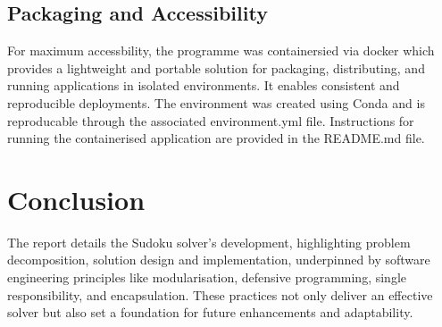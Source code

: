 \documentclass[11pt]{article}
\begin{document}
\subsection{Packaging and Accessibility}
For maximum accessbility, the programme was containersied via docker which provides a lightweight and portable solution for packaging, distributing, and running applications in isolated environments. It enables consistent and reproducible deployments. The environment was created using Conda and is reproducable through the associated environment.yml file. Instructions for running the containerised application are provided in the README.md file.

\section{Conclusion}
The report details the Sudoku solver's development, highlighting problem decomposition, solution design and implementation, underpinned by software engineering principles like modularisation, defensive programming, single responsibility, and encapsulation. These practices not only deliver an effective solver but also set a foundation for future enhancements and adaptability.



\end{document}
